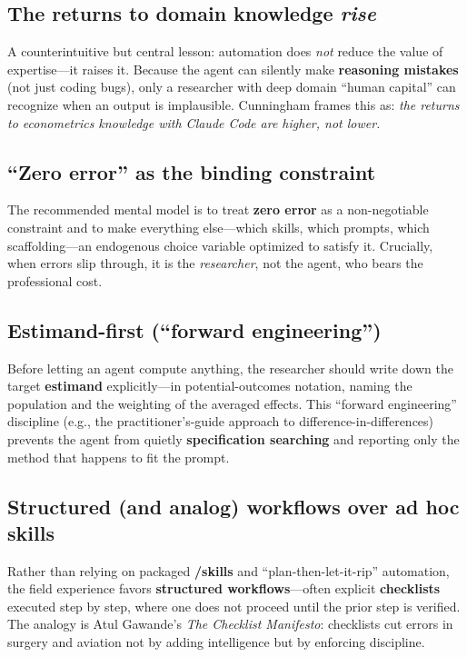 \documentclass[11pt]{article}
\newcommand{\concept}[1]{\textbf{#1}}
\begin{document}
\subsection{The returns to domain knowledge \emph{rise}}
A counterintuitive but central lesson: automation does \emph{not} reduce the
value of expertise---it raises it. Because the agent can silently make
\concept{reasoning mistakes} (not just coding bugs), only a researcher with deep
domain ``human capital'' can recognize when an output is implausible. Cunningham
frames this as: \emph{the returns to econometrics knowledge with Claude Code are
higher, not lower.}

\subsection{``Zero error'' as the binding constraint}
The recommended mental model is to treat \concept{zero error} as a
non-negotiable constraint and to make everything else---which skills, which
prompts, which scaffolding---an endogenous choice variable optimized to satisfy
it. Crucially, when errors slip through, it is the \emph{researcher}, not the
agent, who bears the professional cost.

\subsection{Estimand-first (``forward engineering'')}
Before letting an agent compute anything, the researcher should write down the
target \concept{estimand} explicitly---in potential-outcomes notation, naming
the population and the weighting of the averaged effects. This ``forward
engineering'' discipline (e.g., the practitioner's-guide approach to
difference-in-differences) prevents the agent from quietly
\concept{specification searching} and reporting only the method that happens to
fit the prompt.

\subsection{Structured (and analog) workflows over ad hoc skills}
Rather than relying on packaged \concept{/skills} and ``plan-then-let-it-rip''
automation, the field experience favors \concept{structured workflows}---often
explicit \concept{checklists} executed step by step, where one does not proceed
until the prior step is verified. The analogy is Atul Gawande's
\emph{The Checklist Manifesto}: checklists cut errors in surgery and aviation
not by adding intelligence but by enforcing discipline.
\end{document}
